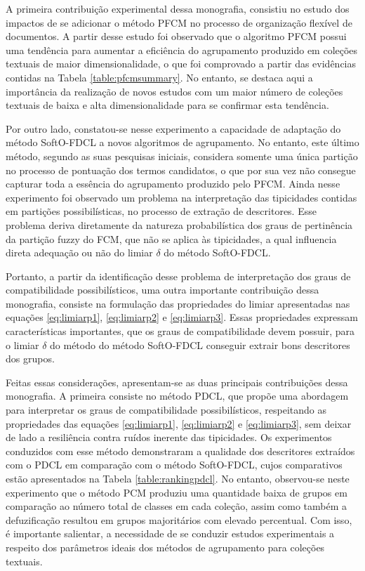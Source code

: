 A primeira contribuição experimental dessa monografia, consistiu no estudo dos impactos de se
adicionar o método PFCM no processo de organização flexível de documentos. A partir desse estudo
foi observado que o algoritmo PFCM possui uma tendência para aumentar a eficiência do
agrupamento produzido em coleções textuais de maior dimensionalidade, o que foi comprovado a partir
das evidências contidas na Tabela \ref{table:pfcmsummary}. No entanto, se destaca aqui a importância
da realização de novos estudos com um maior número de coleções textuais de baixa e alta
dimensionalidade para se confirmar esta tendência. 

Por outro lado, constatou-se nesse experimento a capacidade de adaptação do método
SoftO-FDCL a novos algoritmos de agrupamento. No entanto, este último método, segundo as suas pesquisas iniciais, considera somente uma única
partição no processo de pontuação dos termos candidatos, o que por sua vez não consegue capturar
toda a essência do agrupamento produzido pelo PFCM. Ainda nesse experimento foi observado um
problema na interpretação das tipicidades contidas em partições possibilísticas, no processo de
extração de descritores. Esse problema deriva diretamente da natureza probabilística dos graus de
pertinência da partição fuzzy do FCM, que não se aplica às tipicidades, a qual influencia
direta adequação ou não do limiar $\delta$ do método SoftO-FDCL. 

Portanto, a partir da identificação desse problema de interpretação dos graus de compatibilidade
possibilísticos, uma outra importante contribuição dessa monografia, consiste na formulação das
propriedades do limiar apresentadas nas equações \ref{eq:limiarp1}, \ref{eq:limiarp2} e
\ref{eq:limiarp3}. Essas propriedades expressam características importantes, que os graus de
compatibilidade devem possuir, para o limiar $\delta$ do método do método SoftO-FDCL conseguir
extrair bons descritores dos grupos. 

Feitas essas considerações, apresentam-se as duas principais contribuições dessa monografia. A primeira consiste no
método PDCL, que propõe uma abordagem para interpretar os graus de compatibilidade possibilísticos,
respeitando as propriedades das equações \ref{eq:limiarp1}, \ref{eq:limiarp2} e \ref{eq:limiarp3},
sem deixar de lado a resiliência contra ruídos inerente das tipicidades. Os experimentos conduzidos
com esse método demonstraram a qualidade dos descritores extraídos com o PDCL em comparação com o
método SoftO-FDCL, cujos comparativos estão apresentados na Tabela \ref{table:rankingpdcl}. No entanto, observou-se
neste experimento que o método PCM produziu uma quantidade baixa de grupos em comparação ao número
total de classes em cada coleção, assim como também a defuzificação resultou em grupos majoritários
com elevado percentual. Com isso, é importante salientar, a necessidade de se conduzir estudos
experimentais a respeito dos parâmetros ideais dos métodos de agrupamento para coleções textuais.

